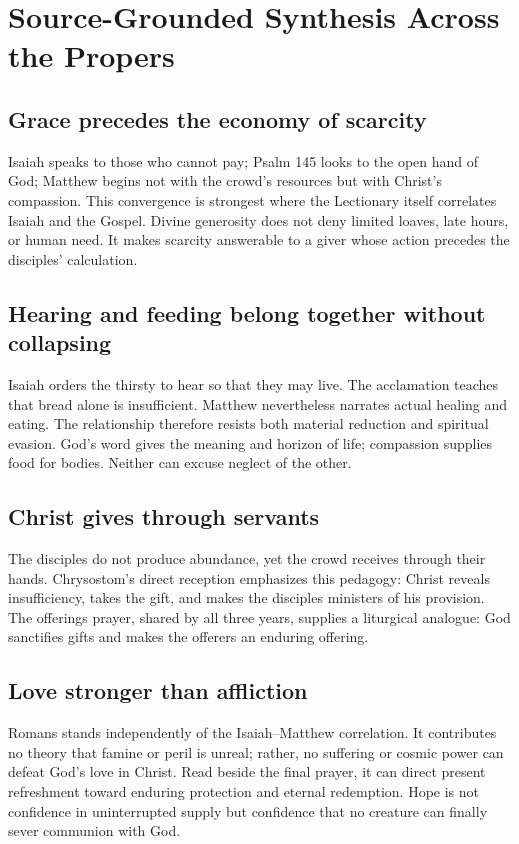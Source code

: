 \section*{Source-Grounded Synthesis Across the Propers}

\subsection*{Grace precedes the economy of scarcity}
Isaiah speaks to those who cannot pay; Psalm 145 looks to the open hand of God; Matthew begins not with the crowd's resources but with Christ's compassion. This convergence is strongest where the Lectionary itself correlates Isaiah and the Gospel. Divine generosity does not deny limited loaves, late hours, or human need. It makes scarcity answerable to a giver whose action precedes the disciples' calculation.

\subsection*{Hearing and feeding belong together without collapsing}
Isaiah orders the thirsty to hear so that they may live. The acclamation teaches that bread alone is insufficient. Matthew nevertheless narrates actual healing and eating. The relationship therefore resists both material reduction and spiritual evasion. God's word gives the meaning and horizon of life; compassion supplies food for bodies. Neither can excuse neglect of the other.

\subsection*{Christ gives through servants}
The disciples do not produce abundance, yet the crowd receives through their hands. Chrysostom's direct reception emphasizes this pedagogy: Christ reveals insufficiency, takes the gift, and makes the disciples ministers of his provision. The offerings prayer, shared by all three years, supplies a liturgical analogue: God sanctifies gifts and makes the offerers an enduring offering.

\subsection*{Love stronger than affliction}
Romans stands independently of the Isaiah--Matthew correlation. It contributes no theory that famine or peril is unreal; rather, no suffering or cosmic power can defeat God's love in Christ. Read beside the final prayer, it can direct present refreshment toward enduring protection and eternal redemption. Hope is not confidence in uninterrupted supply but confidence that no creature can finally sever communion with God.

